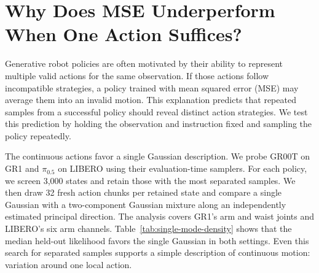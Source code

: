 \section{Why Does MSE Underperform When One Action Suffices?}
\label{sec:single-mode}

Generative robot policies are often motivated by their ability to represent
multiple valid actions for the same observation. If those actions follow
incompatible strategies, a policy trained with mean squared error (MSE) may
average them into an invalid motion. This explanation predicts that repeated
samples from a successful policy should reveal distinct action strategies.
We test this prediction by holding the observation and instruction fixed and
sampling the policy repeatedly.

The continuous actions favor a single Gaussian description.
We probe GR00T on GR1 and $\pi_{0.5}$ on LIBERO using their evaluation-time
samplers. For each policy, we screen 3,000 states and retain those with the
most separated samples. We then draw 32 fresh action chunks per retained
state and compare a single Gaussian with a two-component Gaussian mixture
along an independently estimated principal direction. The analysis covers
GR1's arm and waist joints and LIBERO's six arm channels.
Table~\ref{tab:single-mode-density} shows that the median held-out likelihood
favors the single Gaussian in both settings. Even this search for separated
samples supports a simple description of continuous motion: variation around
one local action.

